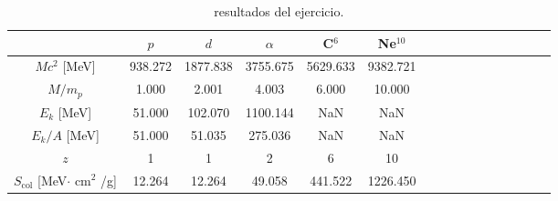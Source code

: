 \begin{table}[H] \centering
\caption{resultados del ejercicio.}
\label{Tab:02-ex05}
\begin{tabular}{cccccccccccccccc}
\toprule
 & $p$ & $d$ & $\alpha$ & C$^{6}$ & Ne$^{10}$ \\
\midrule
$Mc^2$ [MeV] & 938.272 & 1877.838 & 3755.675 & 5629.633 & 9382.721 \\
$M/m_p$ & 1.000 & 2.001 & 4.003 & 6.000 & 10.000 \\
$E_k$ [MeV] & 51.000 & 102.070 & 1100.144 & NaN & NaN \\
$E_k/A$ [MeV] & 51.000 & 51.035 & 275.036 & NaN & NaN \\
$z$ & 1 & 1 & 2 & 6 & 10 \\
$S_{\text{col}}$ [MeV$\cdot$ cm$^2$ /g] & 12.264 & 12.264 & 49.058 & 441.522 & 1226.450 \\
\bottomrule
\end{tabular}
\end{table}
